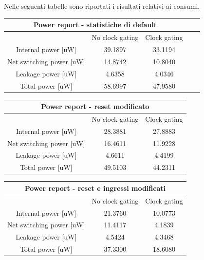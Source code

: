 \documentclass[11pt,  english, makeidx, a4paper, titlepage, oneside]{book}
\begin{document}
\\\\
Nelle seguenti tabelle sono riportati i risultati relativi ai consumi.      
\begin{center}
	\begin{tabular}{|c|c|c|c|c|}
	\hline
	\multicolumn{3}{c}{Power report - statistiche di default}\\
	\hline
	& No clock gating & Clock gating \\
	\hline
	Internal power [uW] & 39.1897 & 33.1194 \\
	\hline
	Net switching power [uW] & 14.8742  & 10.8040 \\
	\hline
	Leakage power [uW] & 4.6358 & 4.0346 \\
	\hline
	Total power [uW] & 58.6997 & 47.9580 \\
	\hline
	\end{tabular}	
\end{center}
\vspace{0.3cm}      
\begin{center}
	\begin{tabular}{|c|c|c|}
	\hline
	\multicolumn{3}{c}{Power report - reset modificato}\\
	\hline
	& No clock gating & Clock gating \\
	\hline
	Internal power [uW] & 28.3881 & 27.8883 \\
	\hline 
 	Net switching power [uW] & 16.4611 & 11.9228 \\
	\hline
	Leakage power [uW] & 4.6611 & 4.4199 \\
	\hline
	Total power [uW] & 49.5103 & 44.2311 \\
	\hline
	\end{tabular}	
\end{center}
\vspace{0.3cm}    
\begin{center}
	\begin{tabular}{|c|c|c|}
	\hline
	\multicolumn{3}{c}{Power report - reset e ingressi modificati}\\
	\hline
	& No clock gating & Clock gating \\
	\hline
	Internal power [uW] & 21.3760 & 10.0773 \\
	\hline 
 	Net switching power [uW] & 11.4117 & 4.1839 \\
	\hline
	Leakage power [uW] & 4.5424 & 4.3468 \\
	\hline
	Total power [uW] & 37.3300 & 18.6080 \\
	\hline
	\end{tabular}	
\end{center}
\end{document}
